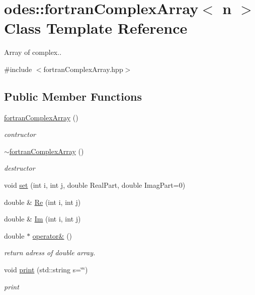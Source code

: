 \hypertarget{classodes_1_1fortranComplexArray}{\section{odes\-:\-:fortran\-Complex\-Array$<$ n $>$ Class Template Reference}
\label{classodes_1_1fortranComplexArray}
}


Array of complex..  




{\ttfamily \#include $<$fortran\-Complex\-Array.\-hpp$>$}

\subsection*{Public Member Functions}
\begin{DoxyCompactItemize}
\item 
\hyperlink{classodes_1_1fortranComplexArray_acd4eafac964a25c1d8da0bb6d7b5b4a9}{fortran\-Complex\-Array} ()
\begin{DoxyCompactList}\small\item\em contructor \end{DoxyCompactList}\item 
\hyperlink{classodes_1_1fortranComplexArray_afc9c69b7f395b99f0d206a2a5c807d25}{$\sim$fortran\-Complex\-Array} ()
\begin{DoxyCompactList}\small\item\em destructor \end{DoxyCompactList}\item 
void \hyperlink{classodes_1_1fortranComplexArray_a14b8b642717e5d1baf9bc04084c954c9}{set} (int i, int j, double Real\-Part, double Imag\-Part=0)
\item 
double \& \hyperlink{classodes_1_1fortranComplexArray_a4b44f77e725c75927054dda1e22c5b7e}{Re} (int i, int j)
\item 
double \& \hyperlink{classodes_1_1fortranComplexArray_a75d7b02f01d3155a6d127f76cf657401}{Im} (int i, int j)
\item 
double $\ast$ \hyperlink{classodes_1_1fortranComplexArray_aa5c13e2bf65b68a05e631cc09a755f80}{operator\&} ()
\begin{DoxyCompactList}\small\item\em return adress of double array. \end{DoxyCompactList}\item 
void \hyperlink{classodes_1_1fortranComplexArray_ab0f1691982089c6fa72207a07c847898}{print} (std\-::string s=\char`\"{}\char`\"{})
\begin{DoxyCompactList}\small\item\em print \end{DoxyCompactList}\end{DoxyCompactItemize}
